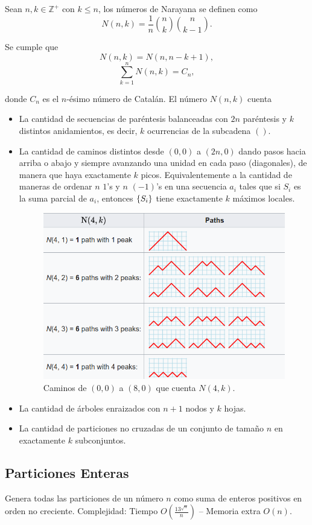 \documentclass[10pt,spanish,mexico]{article}
\newcommand{\Pa}[1]{\left( #1 \right)}
\numberwithin{equation}{section}
\newcommand{\Z}{\mathbb{Z}}
\DeclarePairedDelimiter{\set}{\{}{\}}
\begin{document}
\begin{multicols}{2}
Sean $n, k \in \Z^+$ con $k \leq n$, los números de Narayana se definen como
$$N(n, k) = \frac{1}{n}\binom{n}{k}\binom{n}{k - 1}.$$

Se cumple que
$$N(n, k) = N(n, n - k + 1),$$
$$\sum_{k = 1}^n N(n, k) = C_n,$$

donde $C_n$ es el $n$-ésimo número de Catalán. El número $N(n, k)$ cuenta

\begin{itemize}
    \item La cantidad de secuencias de paréntesis balanceadas con $2n$ paréntesis y $k$ distintos anidamientos, es decir, $k$ ocurrencias de la subcadena $()$.
    \item La cantidad de caminos distintos desde $(0, 0)$ a $(2n, 0)$ dando pasos hacia arriba o abajo y siempre avanzando una unidad en cada paso (diagonales), de manera que haya exactamente $k$ picos. Equivalentemente a la cantidad de maneras de ordenar $n$ $1$'s y $n$ $(-1)$'s en una secuencia $a_i$ tales que si $S_i$ es la suma parcial de $a_i$, entonces $\set{S_i}$ tiene exactamente $k$ máximos locales.
    \begin{figure}[H]
        \centering
        \includegraphics[width=0.5\linewidth]{img/caminos_picos_narayana.png}
        \caption{Caminos de $(0,0)$ a $(8, 0)$ que cuenta $N(4, k)$.}
    \end{figure}
    \item La cantidad de árboles enraizados con $n + 1$ nodos y $k$ hojas.
    \item La cantidad de particiones no cruzadas de un conjunto de tamaño $n$ en exactamente $k$ subconjuntos.
\end{itemize}


\subsection{Particiones Enteras}
Genera todas las particiones de un número \(n\) como suma de enteros positivos en orden no creciente. Complejidad: Tiempo \(O\Pa{ \frac{13^{\sqrt{n}}}{n} }\) – Memoria extra \(O(n)\).


\end{multicols}
\end{document}
